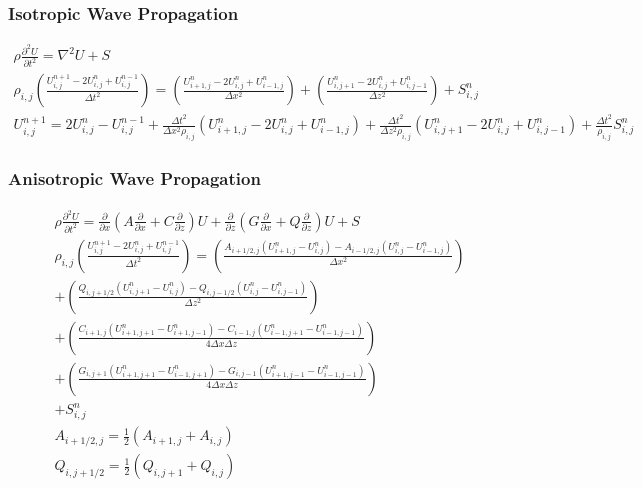\documentclass{beamer}
\begin{document}
\begin{frame}
\frametitle{Isotropic Wave Propagation}
\fontsize{6pt}{7.2}\selectfont
\begin{eqnarray}
\rho \frac{\partial^2 U}{\partial t^2} = \nabla^2 U + S \nonumber \\
\rho_{i,j} \left( \frac{ U^{n+1}_{i,j} - 2 U^n_{i,j} + U^{n-1}_{i,j} }{ \Delta t^2 } \right) = \left( \frac{ U^n_{i+1,j} - 2 U^n_{i,j} + U^n_{i-1,j} }{ \Delta x^2 } \right) + \left( \frac{ U^n_{i,j+1} - 2 U^n_{i,j} + U^n_{i,j-1} }{ \Delta z^2 } \right) + S^n_{i,j} \nonumber \\
U^{n+1}_{i,j} = 2 U^n_{i,j} - U^{n-1}_{i,j} + \frac{\Delta t^2}{\Delta x^2 \rho_{i,j} }\left( U^n_{i+1,j} - 2 U^n_{i,j} + U^n_{i-1,j} \right) + \frac{\Delta t^2}{\Delta z^2 \rho_{i,j} }\left( U^n_{i,j+1} - 2 U^n_{i,j} + U^n_{i,j-1} \right) + \frac{\Delta t^2}{\rho_{i,j}}S^n_{i,j} \nonumber
\end{eqnarray}
\end{frame}

\begin{frame}
\frametitle{Anisotropic Wave Propagation}
\fontsize{3pt}{3.2}\selectfont
\begin{eqnarray}
\rho \frac{\partial^2 U}{\partial t^2} = \frac{\partial}{\partial x} \left( A \frac{\partial}{\partial x} + C \frac{\partial}{\partial z} \right) U + \frac{\partial}{\partial z} \left( G \frac{\partial}{\partial x} + Q \frac{\partial}{\partial z} \right) U + S \nonumber \\
\rho_{i,j} \left( \frac{ U^{n+1}_{i,j} - 2 U^n_{i,j} + U^{n-1}_{i,j} }{ \Delta t^2 } \right) = \left( \frac{ A_{i+1/2,j}(U^n_{i+1,j} - U^n_{i,j}) - A_{i-1/2,j}( U^n_{i,j}- U^n_{i-1,j}) }{ \Delta x^2 } \right) \nonumber \\
    + \left( \frac{ Q_{i,j+1/2} ( U^n_{i,j+1} - U^n_{i,j} ) - Q_{i,j-1/2} ( U^n_{i,j} - U^n_{i,j-1} ) }{ \Delta z^2 } \right) \nonumber \\
    + \left( \frac{ C_{i+1,j} ( U^n_{i+1,j+1} - U^n_{i+1,j-1} ) - C_{i-1,j} ( U^n_{i-1,j+1} - U^n_{i-1,j-1} ) }{ 4 \Delta x \Delta z } \right) \nonumber \\
    + \left( \frac{ G_{i,j+1} ( U^n_{i+1,j+1} - U^n_{i-1,j+1} ) - G_{i,j-1} ( U^n_{i+1,j-1} - U^n_{i-1,j-1} ) }{ 4 \Delta x \Delta z } \right) \nonumber \\
    + S^n_{i,j} \nonumber \\
    A_{i+1/2,j} = \frac{1}{2} (A_{i+1,j} + A_{i,j}) \nonumber \\
    Q_{i,j+1/2} = \frac{1}{2} (Q_{i,j+1} + Q_{i,j}) \nonumber 
\end{eqnarray}
\end{frame}
\end{document}
